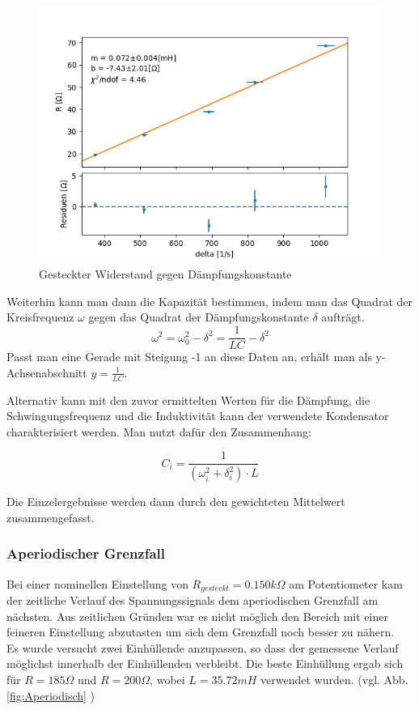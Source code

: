 \documentclass[12pt,a4paper]{article}
\begin{document}
\begin{figure}
	\centering
	\includegraphics[width=0.8\linewidth]{Bilder/fit_L_RLC}
	\caption{Gesteckter Widerstand gegen Dämpfungskonstante}
	\label{pic:fit_L_RLC}
\end{figure}

Weiterhin kann man dann die Kapazität bestimmen, indem man das Quadrat der Kreisfrequenz $\omega$ gegen das Quadrat der Dämpfungskonstante $\delta$ aufträgt.
\begin{equation}
\omega^2 = \omega_0^2 -\delta^2 = \frac{1}{LC} - \delta^2
\end{equation}
Passt man eine Gerade mit Steigung -1 an diese Daten an, erhält man als y-Achsenabschnitt $y = \frac{1}{LC}$.

Alternativ kann mit den zuvor ermittelten Werten für die Dämpfung, die Schwingungsfrequenz und die Induktivität kann der verwendete Kondensator charakterisiert werden. Man nutzt dafür den Zusammenhang:

\begin{equation}
C_i=\frac{1}{(\omega_i^2+\delta_i^2)\cdot L}
\end{equation}

Die Einzelergebnisse werden dann durch den gewichteten Mittelwert zusammengefasst.



\subsubsection{Aperiodischer Grenzfall}
Bei einer nominellen Einstellung von $R_{gesteckt}=0.150k\Omega$ am Potentiometer kam der zeitliche Verlauf des Spannungssignals dem aperiodischen Grenzfall am nächsten. Aus zeitlichen Gründen war es nicht möglich den Bereich mit einer feineren Einstellung abzutasten um sich dem Grenzfall noch besser zu nähern.\\
Es wurde versucht zwei Einhüllende anzupassen, so dass der gemessene Verlauf möglichst innerhalb der Einhüllenden verbleibt. Die beste Einhüllung ergab sich für $R=185\Omega$ und $R=200\Omega$, wobei $L=35.72mH$ verwendet wurden. (vgl. Abb.\ref{fig:Aperiodisch} )
\end{document}
